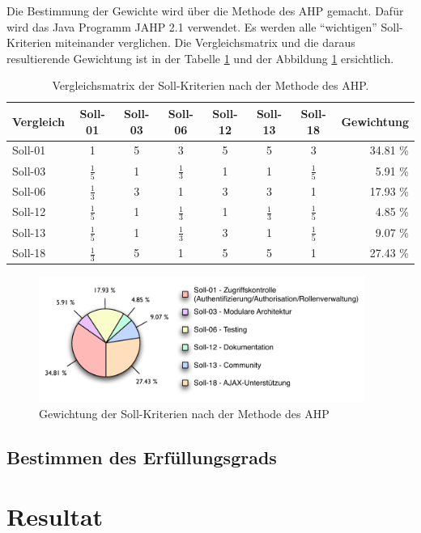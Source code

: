   Die Bestimmung der Gewichte wird über die Methode des \ac{AHP} gemacht. Dafür
  wird das Java Programm JAHP 2.1 verwendet. Es werden alle ``wichtigen'' 
  Soll-Kriterien miteinander verglichen. Die Vergleichsmatrix und die daraus
  resultierende Gewichtung ist in der Tabelle
  \ref{tab:gewichtungDerSollKriterien} und der Abbildung
  \ref{img:gewichtungSollKriterien} ersichtlich.
  
  \begin{table}[!h]
    \sffamily 
    \begin{center}
      \begin{tabular}{l|cccccc|r}
        \toprule
        Vergleich & Soll-01 & Soll-03 & Soll-06 & Soll-12 & Soll-13 & Soll-18
        & Gewichtung\\
        \midrule
        Soll-01 & 1 & 5 & 3 & 5 & 5 & 3 & 34.81 \%\\
        Soll-03 & $\frac{1}{5}$ & 1 & $\frac{1}{3}$ & 1 & 1 & $\frac{1}{5}$ &
        5.91 \%\\
        Soll-06 & $\frac{1}{3}$ & 3 & 1 & 3 & 3 & 1 & 17.93 \%\\
        Soll-12 & $\frac{1}{5}$ & 1 & $\frac{1}{3}$ & 1 & $\frac{1}{3}$ &
        $\frac{1}{5}$ & 4.85 \% \\
        Soll-13 & $\frac{1}{5}$ & 1 & $\frac{1}{3}$ & 3 & 1 & $\frac{1}{5}$ &
        9.07 \%\\ Soll-18 & $\frac{1}{3}$ & 5 & 1 & 5 & 5 & 1 & 27.43 \%\\
        \bottomrule
      \end{tabular}
      \caption{Vergleichsmatrix der Soll-Kriterien nach der Methode des AHP.}
      \label{tab:gewichtungDerSollKriterien}
    \end{center}
  \end{table}
  
  \begin{figure}[ht]
    \begin{center}
      \includegraphics[width=0.95\textwidth]{./image/gewichtungSollKriterien.pdf}
      \caption{Gewichtung der Soll-Kriterien nach der Methode des AHP}
      \label{img:gewichtungSollKriterien}
    \end{center}
  \end{figure}
  
  \subsection{Bestimmen des Erfüllungsgrads}
  
  \section{Resultat}
